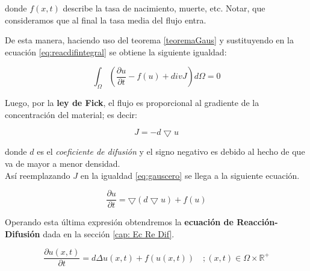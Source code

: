donde $f(x,t)$ describe la tasa de nacimiento, muerte, etc. Notar, que consideramos que al final la tasa media del flujo entra.

\begin{teorem}\label{teoremaGaus}
\end{teorem}

 De esta manera, haciendo uso del teorema \ref{teoremaGaus} y sustituyendo en la ecuación \eqref{eq:reacdifintegral} se obtiene la siguiente igualdad:
 
 \begin{equation}
 	\int_\Omega \left(\frac{\partial u}{\partial t} - f(u) + divJ\right)d\Omega = 0
 	\label{eq:gauscero}
 \end{equation}

 Luego, por la \textbf{ley de Fick}, el flujo es proporcional al gradiente de la concentración del material; es decir:
 
$$ J = -d\bigtriangledown u $$

donde $d$ es el \textit{coeficiente de difusión} y el signo negativo es debido al hecho de que va de mayor a menor densidad.\\

Así reemplazando $J$ en la igualdad \eqref{eq:gauscero} se llega a la siguiente ecuación.

$$ \frac{\partial u}{\partial t} = \bigtriangledown(d\bigtriangledown u) + f(u)$$

Operando esta última expresión obtendremos la \textbf{ecuación de Reacción-Difusión} dada en la sección \ref{cap: Ec Re Dif}.

\begin{equation}
	\label{deduccion3}
	\dfrac { \partial u(x,t) }{ \partial t } =d\Delta u(x,t)+f(u(x,t))\quad ;(x,t)\in \Omega\times { \mathbb{R} }^{ + }
\end{equation}

\vspace{0.1cm}
\begin{obs}
\end{obs}

